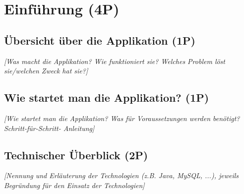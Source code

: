 
\titlespacing*{\chapter}{0pt}{-30mm}{10pt}
  
\chapter{Einführung (4P)}
\pagestyle{scrheadings}
\clearscrheadfoot
{}
\setcounter{page}{1}
\ofoot[\pagemark]{\pagemark}
\onehalfspacing

\section{Übersicht über die Applikation (1P)}
\emph{[Was macht die Applikation? Wie funktioniert sie? Welches Problem löst sie/welchen Zweck hat sie?]}

\section{Wie startet man die Applikation? (1P)}
\emph{[Wie startet man die Applikation? Was für Voraussetzungen werden benötigt? Schritt-für-Schritt-
Anleitung]}

\section{Technischer Überblick (2P)}
\emph{[Nennung und Erläuterung der Technologien (z.B. Java, MySQL, ...), jeweils Begründung für den
Einsatz der Technologien]}